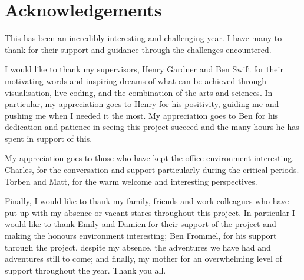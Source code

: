 
\chapter*{Acknowledgements}

This has been an incredibly interesting and challenging year. I have many to thank for their support and guidance through the challenges encountered.

I would like to thank my supervisors, Henry Gardner and Ben Swift for their motivating words and inspiring dreams of what can be achieved through visualisation, live coding, and the combination of the arts and sciences. In particular, my appreciation goes to Henry for his positivity, guiding me and pushing me when I needed it the most. My appreciation goes to Ben for his dedication and patience in seeing this project succeed and the many hours he has spent in support of this.

My appreciation goes to those who have kept the office environment interesting. Charles, for the conversation and support particularly during the critical periods. Torben and Matt, for the warm welcome and interesting perspectives. 

Finally, I would like to thank my family, friends and work colleagues who have put up with my absence or vacant stares throughout this project. In particular I would like to thank Emily and Damien for their support of the project and making the honours environment interesting; Ben Frommel, for his support through the project, despite my absence, the adventures we have had and adventures still to come; and finally, my mother for an overwhelming level of support throughout the year. Thank you all.
